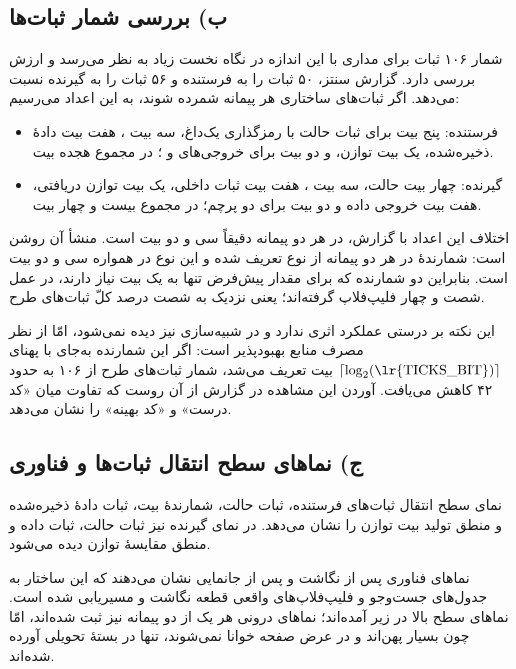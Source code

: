 \documentclass[12pt,a4paper]{article}
\begin{document}
	\subsection*{ب) بررسی شمار ثبات‌ها}
	شمار ۱۰۶ ثبات برای مداری با این اندازه در نگاه نخست زیاد به نظر می‌رسد و ارزش بررسی دارد. گزارش سنتز، ۵۰ ثبات را به فرستنده و ۵۶ ثبات را به گیرنده نسبت می‌دهد. اگر ثبات‌های ساختاری هر پیمانه شمرده شوند، به این اعداد می‌رسیم:
	\begin{itemize}
		\item فرستنده: پنج بیت برای ثبات حالت با رمزگذاری یک‌داغ، سه بیت ، هفت بیت دادهٔ ذخیره‌شده، یک بیت توازن، و دو بیت برای خروجی‌های  و ؛ در مجموع هجده بیت.
		\item گیرنده: چهار بیت حالت، سه بیت ، هفت بیت ثبات داخلی، یک بیت توازن دریافتی، هفت بیت خروجی داده و دو بیت برای دو پرچم؛ در مجموع بیست و چهار بیت.
	\end{itemize}
	اختلاف این اعداد با گزارش، در هر دو پیمانه دقیقاً سی و دو بیت است. منشأ آن روشن است: شمارندهٔ  در هر دو پیمانه از نوع  تعریف شده و این نوع در  همواره سی و دو بیت است. بنابراین دو شمارنده که برای مقدار پیش‌فرض  تنها به یک بیت نیاز دارند، در عمل شصت و چهار فلیپ‌فلاپ گرفته‌اند؛ یعنی نزدیک به شصت درصد کلّ ثبات‌های طرح.

	این نکته بر درستی عملکرد اثری ندارد و در شبیه‌سازی نیز دیده نمی‌شود، امّا از نظر مصرف منابع بهبودپذیر است: اگر این شمارنده به‌جای  با پهنای \(\lceil\log_2(\text{\lr{TICKS\_BIT}})\rceil\) بیت تعریف می‌شد، شمار ثبات‌های طرح از ۱۰۶ به حدود ۴۲ کاهش می‌یافت. آوردن این مشاهده در گزارش از آن روست که تفاوت میان «کد درست» و «کد بهینه» را نشان می‌دهد.

	\subsection*{ج) نماهای سطح انتقال ثبات‌ها و فناوری}
	نمای سطح انتقال ثبات‌های فرستنده، ثبات حالت، شمارندهٔ بیت، ثبات دادهٔ ذخیره‌شده و منطق تولید بیت توازن را نشان می‌دهد. در نمای گیرنده نیز ثبات حالت، ثبات داده و منطق مقایسهٔ توازن دیده می‌شود.


	نماهای فناوری پس از نگاشت و پس از جانمایی نشان می‌دهند که این ساختار به جدول‌های جست‌وجو و فلیپ‌فلاپ‌های واقعی قطعه نگاشت و مسیریابی شده است. نماهای سطح بالا در زیر آمده‌اند؛ نماهای درونی هر یک از دو پیمانه نیز ثبت شده‌اند، امّا چون بسیار پهن‌اند و در عرض صفحه خوانا نمی‌شوند، تنها در بستهٔ تحویلی آورده شده‌اند.
\end{document}
